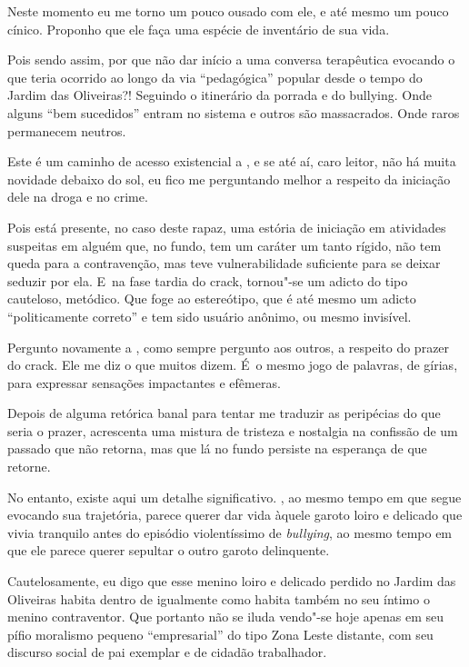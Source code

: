 Neste momento eu me torno um pouco ousado com ele, e até mesmo um pouco
cínico. Proponho que ele faça uma espécie de inventário de sua vida.

Pois sendo assim, por que não dar início a uma conversa terapêutica
evocando o que teria ocorrido ao longo da via ``pedagógica'' popular
desde o tempo do Jardim das Oliveiras?! Seguindo o itinerário da porrada
e do bullying. Onde alguns ``bem sucedidos'' entram no sistema e outros
são massacrados. Onde raros permanecem neutros.

Este é um caminho de acesso existencial a , e se até aí, caro leitor,
não há muita novidade debaixo do sol, eu fico me perguntando melhor a
respeito da iniciação dele na droga e no crime.

Pois está presente, no caso deste rapaz, uma estória de iniciação em
atividades suspeitas em alguém que, no fundo, tem um caráter um tanto
rígido, não tem queda para a contravenção, mas teve vulnerabilidade
suficiente para se deixar seduzir por ela. E~na fase tardia do crack, 
tornou"-se um adicto do tipo cauteloso, metódico. Que foge ao
estereótipo, que é até mesmo um adicto ``politicamente correto'' e tem
sido usuário anônimo, ou mesmo invisível.

Pergunto novamente a , como sempre pergunto aos outros, a respeito do
prazer do crack. Ele me diz o que muitos dizem. É~o mesmo jogo de
palavras, de gírias, para expressar sensações impactantes e efêmeras.

Depois de alguma retórica banal para tentar me traduzir as peripécias do
que seria o prazer,  acrescenta uma mistura de tristeza e nostalgia na
confissão de um passado que não retorna, mas que lá no fundo persiste na
esperança de que retorne.

No entanto, existe aqui um detalhe significativo. , ao mesmo tempo em
que segue evocando sua trajetória, parece querer dar vida àquele garoto
loiro e delicado que vivia tranquilo antes do episódio violentíssimo de
\emph{bullying}, ao mesmo tempo em que ele parece querer sepultar o
outro garoto  delinquente.

Cautelosamente, eu digo que esse menino loiro e delicado perdido no
Jardim das Oliveiras habita dentro de  igualmente como habita também
no seu íntimo o menino contraventor. Que  portanto não se iluda
vendo"-se hoje apenas em seu pífio moralismo pequeno ``empresarial'' do
tipo Zona Leste distante, com seu discurso social de pai exemplar e de
cidadão trabalhador.

